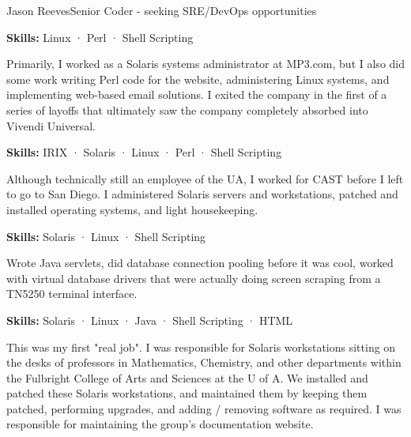 \documentclass{article}
\begin{document}
\begin{cv}[avatar]{Jason Reeves}{Senior Coder - seeking SRE/DevOps opportunities}
\begin{cvevent}[Mar 2000][May 2000]
  \textbf{Skills:} Linux · Perl · Shell Scripting
  \vspace*{5mm}
\end{cvevent}

\begin{cvevent}[Nov 1999][Mar 2000]
  Primarily, I worked as a Solaris systems administrator at MP3.com, but I also did some work writing Perl code for the website, administering Linux systems, and implementing web-based email solutions. I exited the company in the first of a series of layoffs that ultimately saw the company completely absorbed into Vivendi Universal.
  \vspace*{3mm}
  
  \textbf{Skills:} IRIX · Solaris · Linux · Perl · Shell Scripting
  \vspace*{5mm}
\end{cvevent}

\begin{cvevent}[Jan 1998][Nov 1999]
  Although technically still an employee of the UA, I worked for CAST before I left to go to San Diego. I administered Solaris servers and workstations, patched and installed operating systems, and light housekeeping.
  \vspace*{3mm}
  
  \textbf{Skills:} Solaris · Linux · Shell Scripting
  \vspace*{5mm}
\end{cvevent}

\begin{cvevent}[Jan 1997][Nov 1998]
  Wrote Java servlets, did database connection pooling before it was cool, worked with virtual database drivers that were actually doing screen scraping from a TN5250 terminal interface.
  \vspace*{3mm}
  
  \textbf{Skills:} Solaris · Linux · Java · Shell Scripting · HTML
  \vspace*{5mm}
\end{cvevent}

\begin{cvevent}[Nov 1995][Jan 1997]
  This was my first "real job". I was responsible for Solaris workstations sitting on the desks of professors in Mathematics, Chemistry, and other departments within the Fulbright College of Arts and Sciences at the U of A. We installed and patched these Solaris workstations, and maintained them by keeping them patched, performing upgrades, and adding / removing software as required. I was responsible for maintaining the group's documentation website.
  \vspace*{3mm}
  

\end{cvevent}
\end{cv}
\end{document}
